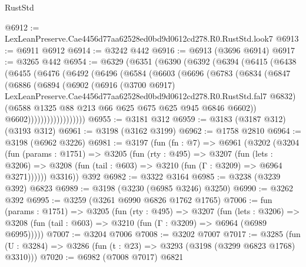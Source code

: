 \begin{lexlean}{RustStd}
\begin{coremodule}
@6912 := LexLeanPreserve.Cae4456d77aa62528ed0bd9d0612cd278.R0.RustStd.look7
@6913 := @6911 @6912
@6914 := @3242 @442
@6916 := @6913 (@3696 @6914)
@6917 := @3265 @442
@6954 := @6329
    (@6351
      (@6390
        (@6392
          (@6394
            (@6415
              (@6438
                (@6455
                  (@6476
                    (@6492
                      (@6496
                        (@6584
                          (@6603
                            (@6696
                              (@6783
                                (@6834
                                  (@6847
                                    (@6886
                                      (@6894
                                        (@6902
                                          (@6916
                                            (@3700 @6917)
                                            LexLeanPreserve.Cae4456d77aa62528ed0bd9d0612cd278.R0.RustStd.fal7
                                            @6832)
                                          (@6588
                                            @1325
                                            @88
                                            @213
                                            @66
                                            @625
                                            @675
                                            @625
                                            @945
                                            @6846
                                            @6602))
                                        @6602))))))))))))))))))
@6955 := @3181 @312
@6959 := @3183 (@3187 @312) (@3193 @312)
@6961 := @3198 (@3162 @3199)
@6962 := @1758 @2810
@6964 := @3198 (@6962 @3226)
@6981 := @3197
    (fun (fn : @7) =>
    @6961
      (@3202
        (@3204
          (fun (params : @1751) =>
          @3205
            (fun (rty : @495) =>
            @3207
              (fun (lets : @3206) =>
              @3208 (fun (tail : @603) => @3210 (fun (Γ : @3209) => @6964 @3271))))))
        @3316))
    @392
@6982 := @3322 @3164
@6985 := @3238 (@3239 @392) @6823
@6989 := @3198 (@3230 (@6985 @3246) @3250)
@6990 := @3262 @392
@6995 := @3259 (@3261 @6990 @6826 @1762 @1765)
@7006 := fun (params : @1751) =>
  @3205
    (fun (rty : @495) =>
    @3207
      (fun (lets : @3206) =>
      @3208 (fun (tail : @603) => @3210 (fun (Γ : @3209) => @6964 (@6989 @6995)))))
@7007 := @3204 @7006
@7008 := @3202 @7007
@7017 := @3285 (fun (U : @3284) => @3286 (fun (t : @23) => @3293 (@3198 (@3299 @6823 @1768) @3310)))
@7020 := @6982 (@7008 @7017) @6821

\end{coremodule}
\end{lexlean}
